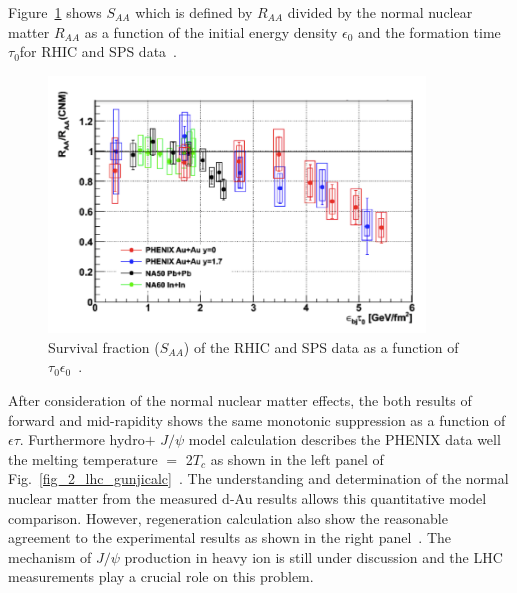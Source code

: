 Figure~\ref{fig_2_saavse} shows $S_{AA}$ which is defined by $R_{AA}$ divided by the normal nuclear matter $R_{AA}$ as a function of the initial energy density $\epsilon _{0}$ and the formation time $\tau_{0}$for RHIC and SPS data~\cite{bib_rhicjpsisaa}.
\begin{figure}[!h]
  \centering
  \includegraphics[width=10cm]{chap2/figure/experimentaldata/saa.png}
  \caption{Survival fraction ($S_{AA}$) of the RHIC and SPS data as a function of $\tau_{0}  \epsilon_{0}$~\cite{bib_rhicjpsisaa}. }
  \label{fig_2_saavse}
\end{figure}
After consideration of the normal nuclear matter effects, the both results of forward and mid-rapidity shows the same monotonic suppression as a function of $\epsilon \tau$. 
Furthermore hydro$+$ $J/\psi$  model calculation describes the PHENIX data well the melting temperature $=$ 2$T_{c}$ as shown in the left panel of Fig.~\ref{fig_2_lhc_gunjicalc}~\cite{bib_gunjicalc}. 
The understanding and determination of the normal nuclear matter from the measured d-Au results allows this quantitative model comparison. 
However, regeneration calculation also show the reasonable agreement to the experimental results as shown in the right panel~\cite{bib_recomodel}. 
The mechanism of $J/\psi$ production in heavy ion is still under discussion and the LHC measurements play a crucial role on this problem. 

